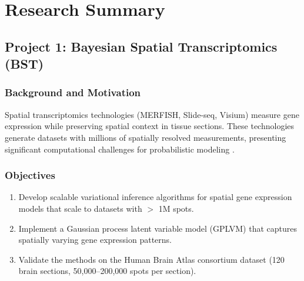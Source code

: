 \documentclass[
    language=english,
    doctype=postdoc-report,
    institution=none,
]{../../omnilatex}
\begin{document}
\maketitle

\begin{abstract}
This annual report summarizes research activities, publications, teaching
contributions, and professional development during the second year of
my postdoctoral fellowship at the Center for Computational Biology,
Department of Computer Science, University of Exampleton. The primary
research focus has been on developing scalable Bayesian methods for
spatial transcriptomics data analysis, with applications to the human
brain atlasing project. Key achievements include 4 peer-reviewed
publications (2 as first author), 2 manuscripts under review, and
the release of an open-source software package with over 500 GitHub
stars. Teaching contributions include co-instructing a graduate course
on probabilistic machine learning and mentoring 3 PhD students.
\end{abstract}

\section{Research Summary}
\label{sec:research}

\subsection{Project 1: Bayesian Spatial Transcriptomics (BST)}

\subsubsection{Background and Motivation}
Spatial transcriptomics technologies (MERFISH, Slide-seq, Visium) measure
gene expression while preserving spatial context in tissue sections. These
technologies generate datasets with millions of spatially resolved
measurements, presenting significant computational challenges for
probabilistic modeling \cite{stahl2016visualization}.

\subsubsection{Objectives}
\begin{enumerate}
    \item Develop scalable variational inference algorithms for spatial
          gene expression models that scale to datasets with $>$ 1M spots.
    \item Implement a Gaussian process latent variable model (GPLVM) that
          captures spatially varying gene expression patterns.
    \item Validate the methods on the Human Brain Atlas consortium dataset
          (120 brain sections, 50,000--200,000 spots per section).
\end{enumerate}
\end{document}
